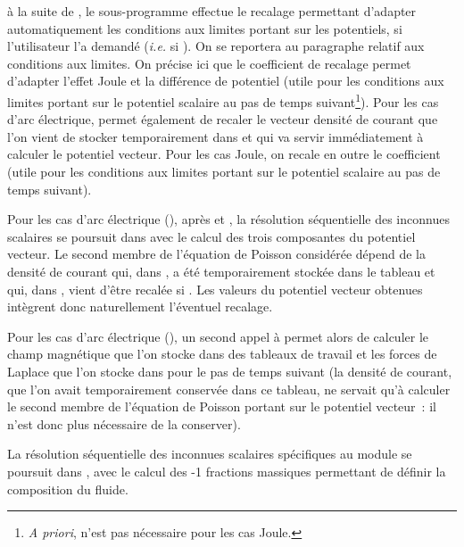 à la suite de ,
le sous-programme  effectue le recalage permettant d'adapter automatiquement
les conditions aux limites portant sur les potentiels, si l'utilisateur l'a
demandé ({\it i.e.} si ).
On se reportera au paragraphe relatif aux conditions aux limites. On précise
ici que le coefficient de recalage  permet d'adapter l'effet Joule
 et la différence de potentiel 
(utile pour les conditions aux limites portant sur le potentiel scalaire au pas
de temps suivant\footnote{{\it A priori},  n'est pas nécessaire pour les
cas Joule.}).
Pour les cas d'arc électrique,  permet également de
recaler le vecteur densité de courant que l'on vient
de stocker temporairement dans  et qui va
servir immédiatement à calculer le potentiel vecteur.
Pour les cas Joule,  on recale en outre le coefficient  (utile
pour les conditions aux limites portant sur le potentiel scalaire au pas de
temps suivant).

Pour les cas d'arc électrique (),
après  et ,
la résolution séquentielle des inconnues scalaires se poursuit dans
 avec le calcul des trois composantes du potentiel vecteur. Le second membre de
l'équation de Poisson considérée dépend de la densité de courant qui,
dans , a été temporairement stockée dans le tableau
 et qui,  dans , vient d'être
recalée si .
Les valeurs du potentiel vecteur obtenues intègrent donc  naturellement l'éventuel
recalage.

Pour les cas d'arc électrique (), un second appel à
 permet alors de calculer le champ magnétique
que l'on stocke dans des tableaux de travail et les forces de Laplace que l'on stocke dans
 pour le pas de temps suivant (la densité de
courant, que l'on avait temporairement conservée dans ce tableau, ne servait
qu'à calculer le second membre de l'équation de Poisson portant sur le
potentiel vecteur~: il n'est donc plus nécessaire de la conserver).

La résolution séquentielle des inconnues scalaires spécifiques au module se poursuit dans
, avec le calcul des -1 fractions massiques permettant
de définir la composition du fluide.

